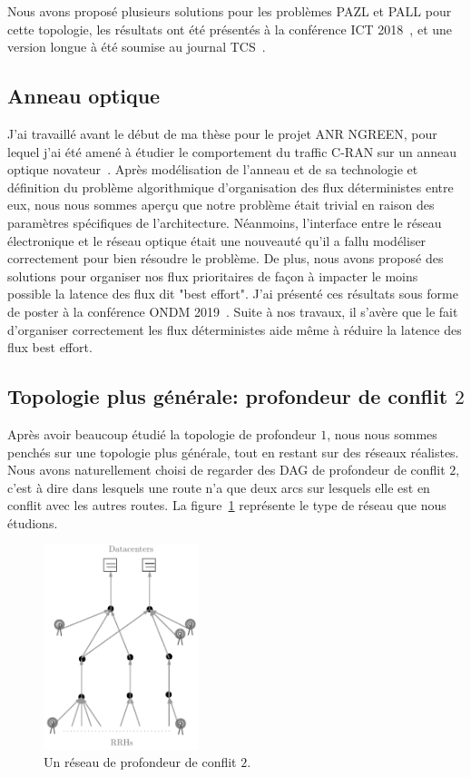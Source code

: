 \documentclass{article}
\begin{document}
  Nous avons proposé plusieurs solutions pour les problèmes PAZL et PALL pour cette topologie, les résultats ont été présentés à la conférence ICT 2018~\cite{DBLP:conf/ict/BarthGLMS18}, et une version longue à été soumise au journal TCS~\cite{DBLP:journals/corr/abs-1902-03018}.
  \subsection{Anneau optique}
  J'ai travaillé avant le début de ma thèse pour le projet ANR NGREEN, pour lequel j'ai été amené à étudier le comportement du traffic C-RAN sur un anneau optique novateur~\cite{ngreenarchitecture,uscumlic2018scalable}.
  Après modélisation de l'anneau et de sa technologie et définition du problème algorithmique d'organisation des flux déterministes entre eux, nous nous sommes aperçu que notre problème était trivial en raison des paramètres spécifiques de l'architecture. Néanmoins, l'interface entre le réseau électronique et le réseau optique était une nouveauté qu'il a fallu modéliser correctement pour bien résoudre le problème. De plus, nous avons proposé des solutions pour organiser nos flux prioritaires de façon à impacter le moins possible la latence des flux dit "best effort". J'ai présenté ces résultats sous forme de poster à la conférence ONDM 2019~\cite{DBLP:journals/corr/abs-1902-03018}. Suite à nos travaux, il s'avère que le fait d'organiser correctement les flux déterministes aide même à réduire la latence des flux best effort.

   \subsection{Topologie plus générale: profondeur de conflit $2$}
 
 Après avoir beaucoup étudié la topologie de profondeur $1$, nous nous sommes penchés sur une topologie plus générale, tout en restant sur des réseaux réalistes. Nous avons naturellement choisi de regarder des DAG de profondeur de conflit $2$, c'est à dire dans lesquels une route n'a que deux arcs sur lesquels elle est en conflit avec les autres routes.
 La figure~\ref{fig:extendendgraphgrey} représente le type de réseau que nous étudions. 

\begin{figure}[h]
\begin{center}
 \includegraphics[width=0.4\textwidth]{extendendgraphgrey}
\caption{Un réseau de profondeur de conflit $2$.}\label{fig:extendendgraphgrey}
\end{center}
\end{figure}
\end{document}
